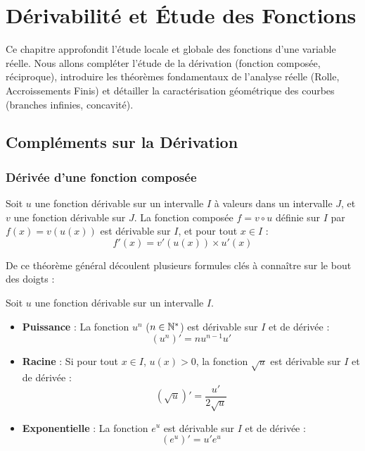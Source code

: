 \chapter{Dérivabilité et Étude des Fonctions}

Ce chapitre approfondit l'étude locale et globale des fonctions d'une variable réelle. Nous allons compléter l'étude de la dérivation (fonction composée, réciproque), introduire les théorèmes fondamentaux de l'analyse réelle (Rolle, Accroissements Finis) et détailler la caractérisation géométrique des courbes (branches infinies, concavité).

\section{Compléments sur la Dérivation}

\subsection{Dérivée d'une fonction composée}

\begin{theoreme}
Soit $u$ une fonction dérivable sur un intervalle $I$ à valeurs dans un intervalle $J$, et $v$ une fonction dérivable sur $J$.
La fonction composée $f = v \circ u$ définie sur $I$ par $f(x) = v(u(x))$ est dérivable sur $I$, et pour tout $x \in I$ :
\[
f'(x) = v'(u(x)) \times u'(x)
\]
\end{theoreme}

De ce théorème général découlent plusieurs formules clés à connaître sur le bout des doigts :

\begin{propriete}
Soit $u$ une fonction dérivable sur un intervalle $I$.
\begin{itemize}
    \item \textbf{Puissance} : La fonction $u^n$ ($n \in \mathbb{N}^*$) est dérivable sur $I$ et de dérivée :
    \[
    (u^n)' = n u^{n-1} u'
    \]
    \item \textbf{Racine} : Si pour tout $x \in I$, $u(x) > 0$, la fonction $\sqrt{u}$ est dérivable sur $I$ et de dérivée :
    \[
    (\sqrt{u})' = \frac{u'}{2\sqrt{u}}
    \]
    \item \textbf{Exponentielle} : La fonction $e^u$ est dérivable sur $I$ et de dérivée :
    \[
    (e^u)' = u' e^u
    \]
\end{itemize}
\end{propriete}

